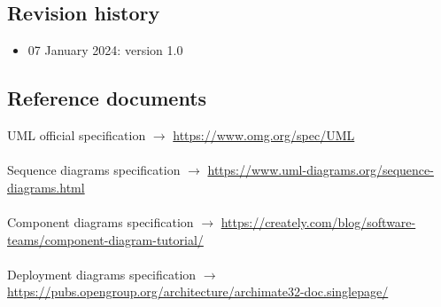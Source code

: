 \documentclass{article}
\begin{document}
{\subsection{Revision history}
\begin{itemize}
    \item 07 January 2024: version 1.0
\end{itemize}

\subsection{Reference documents}
UML official specification $\rightarrow$ \url{https://www.omg.org/spec/UML}
\\ \\
Sequence diagrams specification $\rightarrow$ \url{https://www.uml-diagrams.org/sequence-diagrams.html}
\\ \\
Component diagrams specification $\rightarrow$ \url{https://creately.com/blog/software-teams/component-diagram-tutorial/}
\\ \\
Deployment diagrams specification $\rightarrow$ \url{https://pubs.opengroup.org/architecture/archimate32-doc.singlepage/}
}
\end{document}
